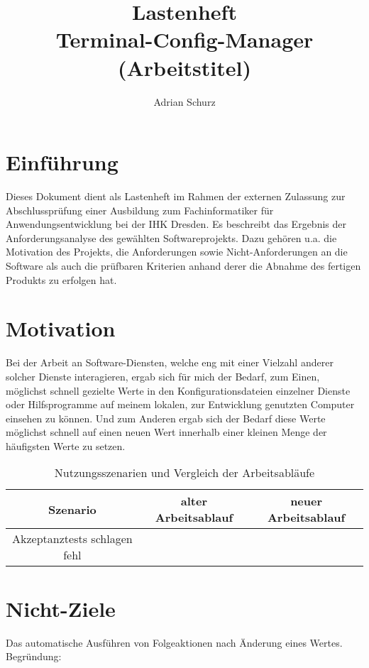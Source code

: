 \documentclass[a4paper,11pt]{article}
\author{Adrian Schurz}
\title{Lastenheft\\[0.2em]\smaller{}Terminal-Config-Manager (Arbeitstitel)}
\begin{document}
\maketitle
{}
\newpage
{}
\tableofcontents

\section{Einführung}
Dieses Dokument dient als Lastenheft im Rahmen der externen Zulassung  zur Abschlussprüfung einer Ausbildung zum Fachinformatiker für Anwendungsentwicklung bei der IHK Dresden. Es beschreibt das Ergebnis der Anforderungsanalyse des gewählten Softwareprojekts. Dazu gehören u.a. die Motivation des Projekts, die Anforderungen sowie Nicht-Anforderungen an die Software als auch die prüfbaren Kriterien anhand derer die Abnahme des fertigen Produkts zu erfolgen hat.

\section{Motivation}
Bei der Arbeit an Software-Diensten, welche eng mit einer Vielzahl anderer solcher Dienste interagieren, ergab sich für mich der Bedarf, zum Einen, möglichst schnell gezielte Werte in den Konfigurationsdateien einzelner Dienste oder Hilfsprogramme auf meinem lokalen, zur Entwicklung genutzten Computer einsehen zu können. Und zum Anderen ergab sich der Bedarf diese Werte möglichst schnell auf einen neuen Wert innerhalb einer kleinen Menge der häufigsten Werte zu setzen.

\begin{center}
\begin{table}[h]
	\caption{Nutzungsszenarien und Vergleich der Arbeitsabläufe}
\begin{tabular}{|c|c|c|}
	\hline
	Szenario & alter Arbeitsablauf & neuer Arbeitsablauf \\
	\hline
	Akzeptanztests schlagen fehl &  &  \\
	\hline
\end{tabular}
\end{table}
\end{center}

\section{Nicht-Ziele}
Das automatische Ausführen von Folgeaktionen nach Änderung eines Wertes. Begründung: 
\end{document}
